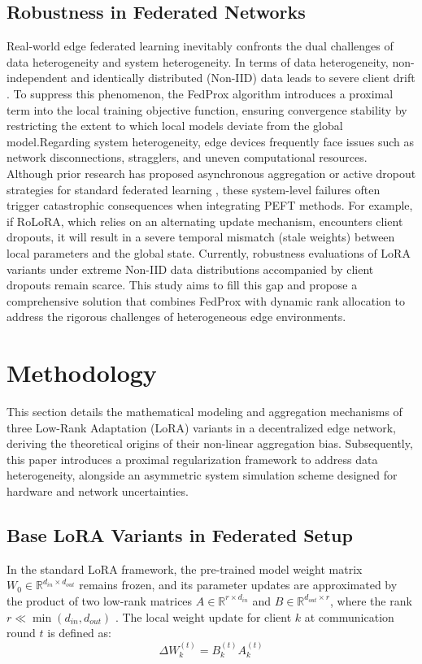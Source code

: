 \subsection{Robustness in Federated Networks}Real-world edge federated learning inevitably confronts the dual challenges of data heterogeneity and system heterogeneity. In terms of data heterogeneity, non-independent and identically distributed (Non-IID) data leads to severe client drift \cite{zhao2018federated}. To suppress this phenomenon, the FedProx algorithm \cite{li2020federated} introduces a proximal term into the local training objective function, ensuring convergence stability by restricting the extent to which local models deviate from the global model.Regarding system heterogeneity, edge devices frequently face issues such as network disconnections, stragglers, and uneven computational resources. Although prior research has proposed asynchronous aggregation or active dropout strategies for standard federated learning \cite{xie2019asynchronous}, these system-level failures often trigger catastrophic consequences when integrating PEFT methods. For example, if RoLoRA, which relies on an alternating update mechanism, encounters client dropouts, it will result in a severe temporal mismatch (stale weights) between local parameters and the global state. Currently, robustness evaluations of LoRA variants under extreme Non-IID data distributions accompanied by client dropouts remain scarce. This study aims to fill this gap and propose a comprehensive solution that combines FedProx with dynamic rank allocation to address the rigorous challenges of heterogeneous edge environments.


\section{Methodology}
This section details the mathematical modeling and aggregation mechanisms of three Low-Rank Adaptation (LoRA) variants in a decentralized edge network, deriving the theoretical origins of their non-linear aggregation bias. Subsequently, this paper introduces a proximal regularization framework to address data heterogeneity, alongside an asymmetric system simulation scheme designed for hardware and network uncertainties.

\subsection{Base LoRA Variants in Federated Setup}
In the standard LoRA framework, the pre-trained model weight matrix $W_0 \in \mathbb{R}^{d_{in} \times d_{out}}$ remains frozen, and its parameter updates are approximated by the product of two low-rank matrices $A \in \mathbb{R}^{r \times d_{in}}$ and $B \in \mathbb{R}^{d_{out} \times r}$, where the rank $r \ll \min(d_{in}, d_{out})$ \cite{hu2021lora}. The local weight update for client $k$ at communication round $t$ is defined as:
\begin{equation}
\Delta W_k^{(t)} = B_k^{(t)} A_k^{(t)}
\end{equation}

